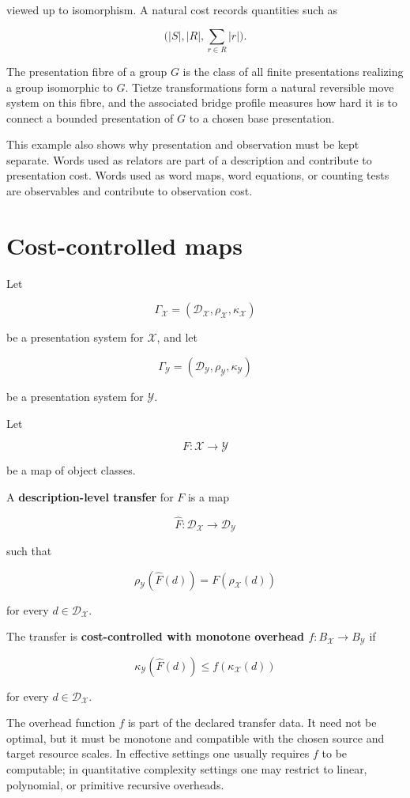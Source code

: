 \documentclass[11pt]{article}
\begin{document}
viewed up to isomorphism. A natural cost records quantities such as

\[
\bigl(|S|,|R|,\sum_{r\in R}|r|\bigr).
\]

The presentation fibre of a group \(G\) is the class of all finite presentations realizing a group isomorphic to \(G\). Tietze transformations form a natural reversible move system on this fibre, and the associated bridge profile measures how hard it is to connect a bounded presentation of \(G\) to a chosen base presentation.

This example also shows why presentation and observation must be kept separate. Words used as relators are part of a description and contribute to presentation cost. Words used as word maps, word equations, or counting tests are observables and contribute to observation cost.


\section{Cost-controlled maps}

Let

\[
\Gamma_\mathcal X=(\mathcal D_\mathcal X,\rho_\mathcal X,\kappa_\mathcal X)
\]

be a presentation system for \(\mathcal X\), and let

\[
\Gamma_\mathcal Y=(\mathcal D_\mathcal Y,\rho_\mathcal Y,\kappa_\mathcal Y)
\]

be a presentation system for \(\mathcal Y\).

Let

\[
F:\mathcal X\to\mathcal Y
\]

be a map of object classes.

A \textbf{description-level transfer} for \(F\) is a map

\[
\widehat F:\mathcal D_\mathcal X\to\mathcal D_\mathcal Y
\]

such that

\[
\rho_\mathcal Y(\widehat F(d))=F(\rho_\mathcal X(d))
\]

for every \(d\in\mathcal D_\mathcal X\).

The transfer is \textbf{cost-controlled with monotone overhead \(f:B_\mathcal X\to B_\mathcal Y\)} if

\[
\kappa_\mathcal Y(\widehat F(d))
\leq
f(\kappa_\mathcal X(d))
\]

for every \(d\in\mathcal D_\mathcal X\).

The overhead function \(f\) is part of the declared transfer data. It need not be optimal, but it must be monotone and compatible with the chosen source and target resource scales. In effective settings one usually requires \(f\) to be computable; in quantitative complexity settings one may restrict to linear, polynomial, or primitive recursive overheads.
\end{document}
